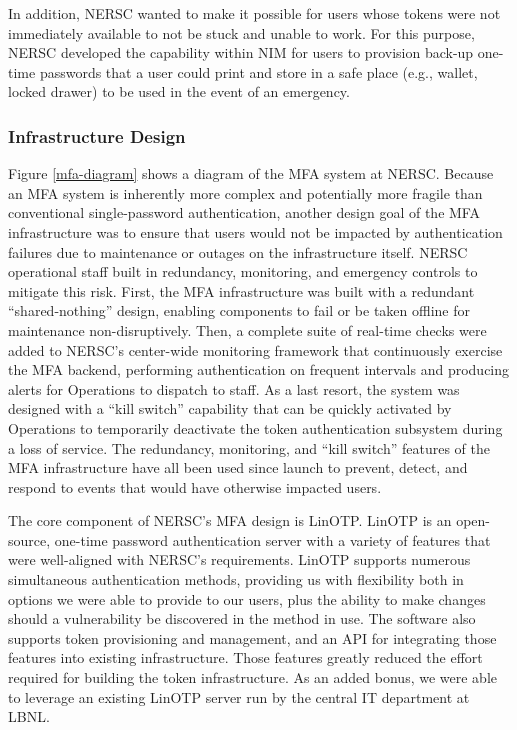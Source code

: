 \documentclass[sigconf,review]{acmart}
\begin{document}
In addition, NERSC wanted to make it possible for users whose tokens were not
immediately available to not be stuck and unable to work. For this purpose,
NERSC developed the capability within NIM for users to provision back-up
one-time passwords that a user could print and store in a safe place (e.g.,
wallet, locked drawer) to be used in the event of an emergency.

\subsubsection{Infrastructure Design}
\label{infra}

Figure \ref{mfa-diagram} shows a diagram of the MFA system at NERSC. Because an
MFA system is inherently more complex and potentially more fragile than
conventional single-password authentication, another design goal of the MFA
infrastructure was to ensure that users would not be impacted by authentication
failures due to maintenance or outages on the infrastructure itself. NERSC
operational staff built in redundancy, monitoring, and emergency controls to
mitigate this risk. First, the MFA infrastructure was built with a redundant
``shared-nothing'' design, enabling components to fail or be taken offline for
maintenance non-disruptively. Then, a complete suite of real-time checks were
added to NERSC's center-wide monitoring framework that continuously exercise the
MFA backend, performing authentication on frequent intervals and producing
alerts for Operations to dispatch to staff. As a last resort, the system was
designed with a ``kill switch'' capability that can be quickly activated by
Operations to temporarily deactivate the token authentication subsystem during a
loss of service. The redundancy, monitoring, and ``kill switch'' features of the
MFA infrastructure have all been used since launch to prevent, detect, and
respond to events that would have otherwise impacted users.

The core component of NERSC's MFA design is LinOTP. LinOTP is an open-source,
one-time password authentication server \cite{linotp} with a variety of features
that were well-aligned with NERSC's requirements.  LinOTP supports numerous
simultaneous  authentication methods, providing us with flexibility both in
options we were able to provide to our users, plus the ability to make changes
should a vulnerability be discovered in the method in use.  The software also
supports token provisioning and management, and an API for integrating those
features into existing infrastructure. Those features greatly reduced the effort
required for building the token infrastructure. As an added bonus, we were able
to leverage an existing LinOTP server run by the central IT department at LBNL.
\end{document}
